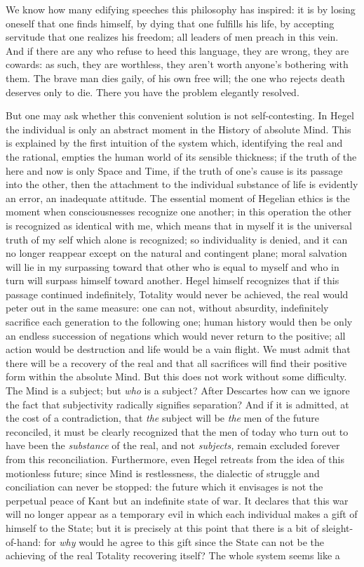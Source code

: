 \documentclass[11pt]{article}
\begin{document}
{{We know how many edifying speeches this philosophy has inspired: it is by losing oneself that one finds himself, by dying that one fulfills his life, by accepting servitude that one realizes his freedom; all leaders of men preach in this vein. And if there are any who refuse to heed this language, they are wrong, they are cowards: as such, they are worthless, they aren’t worth anyone’s bothering with them. The brave man dies gaily, of his own free will; the one who rejects death deserves only to die. There you have the problem elegantly resolved.

But one may ask whether this convenient solution is not self-contesting. In Hegel the individual is only an abstract moment in the History of absolute Mind. This is explained by the first intuition of the system which, identifying the real and the rational, empties the human world of its sensible thickness; if the truth of the here and now is only Space and Time, if the truth of one’s cause is its passage into the other, then the attachment to the individual substance of life is evidently an error, an inadequate attitude. The essential moment of Hegelian ethics is the moment when consciousnesses recognize one another; in this operation the other is recognized as identical with me, which means that in myself it is the universal truth of my self which alone is recognized; so individuality is denied, and it can no longer reappear except on the natural and contingent plane; moral salvation will lie in my surpassing toward that other who is equal to myself and who in turn will surpass himself toward another. Hegel himself recognizes that if this passage continued indefinitely, Totality would never be achieved, the real would peter out in the same measure: one can not, without absurdity, indefinitely sacrifice each generation to the following one; human history would then be only an endless succession of negations which would never return to the positive; all action would be destruction and life would be a vain flight. We must admit that there will be a recovery of the real and that all sacrifices will find their positive form within the absolute Mind. But this does not work without some difficulty. The Mind is a subject; but \textit{who} is a subject? After Descartes how can we ignore the fact that subjectivity radically signifies separation? And if it is admitted, at the cost of a contradiction, that \textit{the} subject will be \textit{the} men of the future reconciled, it must be clearly recognized that the men of today who turn out to have been the \textit{substance} of the real, and not \textit{subjects, }remain excluded forever from this reconciliation. Furthermore, even Hegel retreats from the idea of this motionless future; since Mind is restlessness, the dialectic of struggle and conciliation can never be stopped: the future which it envisages is not the perpetual peace of Kant but an indefinite state of war. It declares that this war will no longer appear as a temporary evil in which each individual makes a gift of himself to the State; but it is precisely at this point that there is a bit of sleight-of-hand: for \textit{why} would he agree to this gift since the State can not be the achieving of the real Totality recovering itself? The whole system seems like a }}
\end{document}
